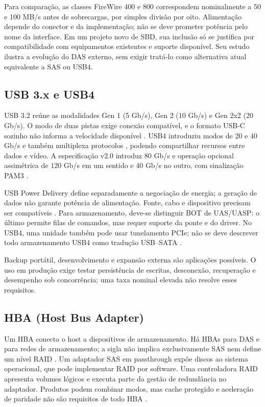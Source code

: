\documentclass[titlepage]{article}
\begin{document}
Para comparação, as classes FireWire 400 e 800 correspondem nominalmente a 50 e 100 MB/s antes de sobrecargas, por simples divisão por oito. Alimentação depende do conector e da implementação; não se deve prometer potência pelo nome da interface. Em um projeto novo de SBD, sua inclusão só se justifica por compatibilidade com equipamentos existentes e suporte disponível. Seu estudo ilustra a evolução do DAS externo, sem exigir tratá-lo como alternativa atual equivalente a SAS ou USB4.

\subsection{USB 3.x e USB4}
USB 3.2 reúne as modalidades Gen 1 (5 Gb/s), Gen 2 (10 Gb/s) e Gen 2x2 (20 Gb/s). O modo de duas pistas exige conexão compatível, e o formato USB-C sozinho não informa a velocidade disponível \cite{usb32}. USB4 introduziu modos de 20 e 40 Gb/s e também multiplexa protocolos \cite{usb4_overview}, podendo compartilhar recursos entre dados e vídeo. A especificação v2.0 introduz 80 Gb/s e operação opcional assimétrica de 120 Gb/s em um sentido e 40 Gb/s no outro, com sinalização PAM3 \cite{usb4_announcement}.

USB Power Delivery define separadamente a negociação de energia; a geração de dados não garante potência de alimentação. Fonte, cabo e dispositivo precisam ser compatíveis \cite{usb_pd}. Para armazenamento, deve-se distinguir BOT de UAS/UASP: o último permite filas de comandos, mas requer suporte da ponte e do driver. No USB4, uma unidade também pode usar tunelamento PCIe; não se deve descrever todo armazenamento USB4 como tradução USB--SATA \cite{usb_uas,usb4_spec}.

Backup portátil, desenvolvimento e expansão externa são aplicações possíveis. O uso em produção exige testar persistência de escritas, desconexão, recuperação e desempenho sob concorrência; uma taxa nominal elevada não resolve esses requisitos.

\subsection{HBA (Host Bus Adapter)}
Um HBA conecta o host a dispositivos de armazenamento. Há HBAs para DAS e para redes de armazenamento; a sigla não implica exclusivamente SAS nem define um nível RAID \cite{snia_dictionary}. Um adaptador SAS em passthrough expõe discos ao sistema operacional, que pode implementar RAID por software. Uma controladora RAID apresenta volumes lógicos e executa parte da gestão de redundância no adaptador. Produtos podem combinar modos, mas cache protegido e aceleração de paridade não são requisitos de todo HBA \cite{microchip_storage}.
\end{document}
